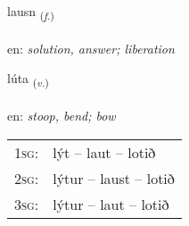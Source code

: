 \documentclass[frontgrid, backgrid]{flacards}\usepackage[]{graphicx}\usepackage[]{color}
\begin{document}
\renewcommand{\blhead}{\vskip5pt {\small\bfseries\footnotesize Nafnorð | Noun }}
\renewcommand{\bcfoot}{\vskip5pt \hspace{2pt}{\small\bfseries\footnotesize 2K}}


{lausn \small{\textsubscript{(\textit{f.})}} \\[1ex] %
\textphonetic{[lœistn̥]} \\
en: \emph{solution, answer; liberation} \\  [2ex]
\renewcommand*{\arraystretch}{0.8}
}

\renewcommand{\flhead}{\vskip5pt \fboxsep=0pt {\small\bfseries\footnotesize Sagnorð | Verb}}
\renewcommand{\fcfoot}{\vskip5pt \fboxsep=0pt \hspace{2pt}{\small\bfseries\footnotesize 2K}}

\renewcommand{\blhead}{\vskip5pt {\small\bfseries\footnotesize Sagnorð | Verb }}
\renewcommand{\bcfoot}{\vskip5pt \hspace{2pt}{\small\bfseries\footnotesize 2K}}


{lúta \small{\textsubscript{(\textit{v.})}} \\[1ex] %
\textphonetic{[luːta]} \\
en: \emph{stoop, bend; bow} \\  [2ex]
\renewcommand*{\arraystretch}{0.8}
\begin{tabular}{p{1cm}l}
\textsc{1sg}: & lýt -- laut -- lotið \\ 
\textsc{2sg}: & lýtur -- laust -- lotið \\ 
\textsc{3sg}: & lýtur -- laut -- lotið \\ 
\end{tabular}
}

\renewcommand{\flhead}{\vskip5pt \fboxsep=0pt {\small\bfseries\footnotesize Nafnorð | Noun}}
\renewcommand{\fcfoot}{\vskip5pt \fboxsep=0pt \hspace{2pt}{\small\bfseries\footnotesize 2K}}
\end{document}
